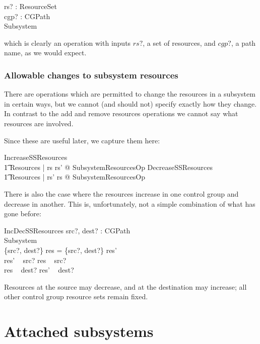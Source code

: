 \documentclass[a4paper,twoside,12pt]{article}
\begin{document}
\begin{schema*}
rs? : ResourceSet\\
cgp? : CGPath\\
\Delta Subsystem
\end{schema*}
which is clearly an operation with inputs $rs?$, a set of resources, and $cgp?$, a path name, as we would expect.

\subsubsection{Allowable changes to subsystem resources}

There are operations which are permitted to change the resources in a subsystem in certain ways, but
we cannot (and should not) specify exactly how they change. In contrast to the add and remove resources
operations we cannot say what resources are involved.

Since these are useful later, we capture them here:

\begin{zed}
IncreaseSSResources  \\
	\t1 \exists \Delta Resources | rs \subseteq rs' @ SubsystemResourcesOp 
\also
DecreaseSSResources  \\
	\t1 \exists \Delta Resources | rs' \subseteq rs @ SubsystemResourcesOp 
\end{zed}

There is also the case where the resources increase in one control group and decrease in another.
This is, unfortunately, not a simple combination of what has gone before:


\begin{schema}{IncDecSSResources}
src?, dest? : CGPath \\
\Delta Subsystem \\
\where
\{src?, dest?\} \ndres res = \{src?, dest?\} \ndres res' \\
res' ~ src? \subseteq res ~ src? \\
res ~ dest? \subseteq res' ~ dest?
\end{schema}
Resources at the source may decrease, and at the destination may increase; all other control group resource
sets remain fixed.


\section{Attached subsystems}
\label{sec:attss}
\end{document}
